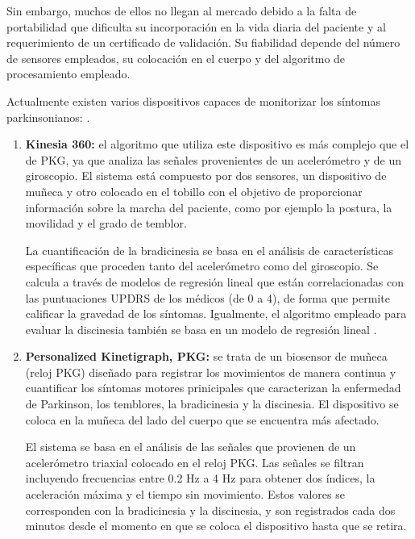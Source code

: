 Sin embargo, muchos de ellos no llegan al mercado debido a la falta de portabilidad que dificulta su incorporación en la vida diaria del paciente y al requerimiento de un certificado de validación. Su fiabilidad depende del número de sensores empleados, su colocación en el cuerpo y del algoritmo de procesamiento empleado. 

Actualmente existen varios dispositivos capaces de monitorizar los síntomas parkinsonianos: \cite{rodriguez2022new}.

\begin{enumerate}
    \item \textbf{Kinesia 360:} el algoritmo que utiliza este dispositivo es más complejo que el de PKG, ya que analiza las señales provenientes de un acelerómetro y de un giroscopio. El sistema está compuesto por dos sensores, un dispositivo de muñeca y otro colocado en el tobillo con el objetivo de proporcionar información sobre la marcha del paciente, como por ejemplo la postura, la movilidad y el grado de temblor. %
    
    La cuantificación de la bradicinesia se basa en el análisis de características específicas que proceden tanto del acelerómetro como del giroscopio. Se calcula a través de modelos de regresión lineal que están correlacionadas con las puntuaciones UPDRS de los médicos (de 0 a 4), de forma que permite calificar la gravedad de los síntomas. Igualmente, el algoritmo empleado para evaluar la discinesia también se basa en un modelo de regresión lineal \cite{heldman2012automated, piromalis2021commercially}.

    
    \item \textbf{Personalized Kinetigraph, PKG:} se trata de un biosensor de muñeca (reloj PKG)%
    diseñado para registrar los movimientos de manera continua y cuantificar los síntomas motores prinicipales que caracterizan la enfermedad de Parkinson, los temblores, la bradicinesia y la discinesia. El dispositivo se coloca en la muñeca del lado del cuerpo que se encuentra más afectado. 

    El sistema se basa en el análisis de las señales que provienen de un acelerómetro triaxial colocado en el reloj PKG. Las señales se filtran incluyendo frecuencias entre 0.2 Hz a 4 Hz para obtener dos índices, la aceleración máxima  y el tiempo sin movimiento. Estos valores se corresponden con la bradicinesia y la discinesia, y son registrados cada dos minutos desde el momento en que se coloca el dispositivo hasta que se retira.


\end{enumerate}
